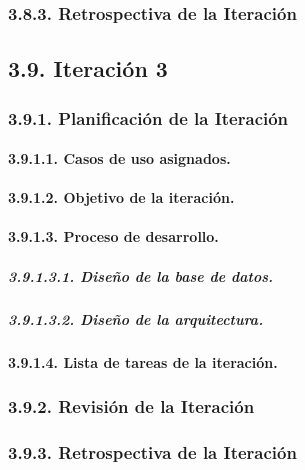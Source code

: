 
\subsubsection{3.8.3. Retrospectiva de la Iteración}


\subsection{3.9. Iteración 3}

\subsubsection{3.9.1. Planificación de la Iteración}

\paragraph{3.9.1.1. Casos de uso asignados.}


\paragraph{3.9.1.2. Objetivo de la iteración.}


\paragraph{3.9.1.3. Proceso de desarrollo.}

\subparagraph{3.9.1.3.1. Diseño de la base de datos.}


\subparagraph{3.9.1.3.2. Diseño de la arquitectura.}


\paragraph{3.9.1.4. Lista de tareas de la iteración.}


\subsubsection{3.9.2. Revisión de la Iteración}


\subsubsection{3.9.3. Retrospectiva de la Iteración}

